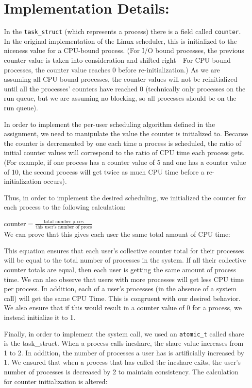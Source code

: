 \documentclass[10pt]{article}
\begin{document}
\section{Implementation Details:}

In the \texttt{task\_struct} (which represents a process) there is a field called \texttt{counter}. In the original implementation of the Linux scheduler, this is initialized to the niceness value for a CPU-bound process. (For I/O bound processes, the previous counter value is taken into consideration and shifted right—For CPU-bound processes, the counter value reaches 0 before re-initialization.) As we are assuming all CPU-bound processes, the counter values will not be reinitialized until all the processes' counters have reached 0 (technically only processes on the run queue, but we are assuming no blocking, so all processes should be on the run queue).

In order to implement the per-user scheduling algorithm defined in the assignment, we need to manipulate the value the counter is initialized to. Because the counter is decremented by one each time a process is scheduled, the ratio of initial counter values will correspond to the ratio of CPU time each process gets. (For example, if one process has a counter value of 5 and one has a counter value of 10, the second process will get twice as much CPU time before a re-initialization occurs).

Thus, in order to implement the desired scheduling, we initialized the counter for each process to the following calculation:

counter$ = \frac{\text{total number procs}}{\text{this user's number of procs}}$ \\
We can prove that this gives each user the same total amount of CPU time:

This equation ensures that each user's collective counter total for their processes will be equal to the total number of processes in the system. If all their collective counter totals are equal, then each user is getting the same amount of process time. We can also observe that users with more processes will get less CPU time per process. In addition, each of a user's processes (in the absence of a system call) will get the same CPU Time. This is congruent with our desired behavior. We also ensure that if this would result in a counter value of 0 for a process, we instead initialize it to 1.

Finally, in order to implement the system call, we used an \texttt{atomic\_t} called share is the task\_struct. When a process calls incshare, the share value increases from 1 to 2. In addition, the number of processes a user has is artificially increased by 1. We ensured that when a process that has called the incshare exits, the user's number of processes is decreased by 2 to maintain consistency. The calculation for counter initialization is altered:
\end{document}
